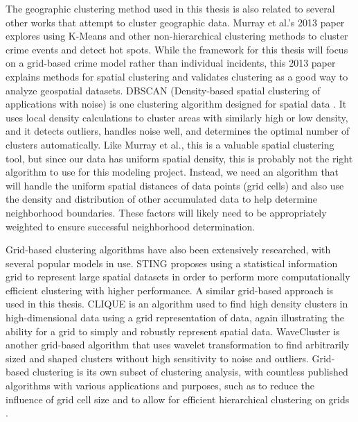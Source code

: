 \documentclass[times new roman,12pt]{article}
\begin{document}
The geographic clustering method used in this thesis is also related to several other works that attempt to cluster geographic data. Murray et al.'s 2013 paper \cite{murray_exploring_2013} explores using K-Means and other non-hierarchical clustering methods to cluster crime events and detect hot spots. While the framework for this thesis will focus on a grid-based crime model rather than individual incidents, this 2013 paper explains methods for spatial clustering and validates clustering as a good way to analyze geospatial datasets. DBSCAN (Density-based spatial clustering of applications with noise)  is one clustering algorithm designed for spatial data \cite{esterdensity}. It uses local density calculations to cluster areas with similarly high or low density, and it detects outliers, handles noise well, and determines the optimal number of clusters automatically. Like Murray et al., this is a valuable spatial clustering tool, but since our data has uniform spatial density, this is probably not the right algorithm to use for this modeling project. Instead, we need an algorithm that will handle the uniform spatial distances of data points (grid cells) and also use the density and distribution of other accumulated data to help determine neighborhood boundaries. These factors will likely need to be appropriately weighted to ensure successful neighborhood determination. 

Grid-based clustering algorithms have also been extensively researched, with several popular models in use. STING \cite{wang_wei_sting_1997} proposes using a statistical information grid to represent large spatial datasets in order to perform more computationally efficient clustering with higher performance. A similar grid-based approach is used in this thesis. CLIQUE \cite{Agrawal:1998:ASC:276304.276314} is an algorithm used to find high density clusters in high-dimensional data using a grid representation of data, again illustrating the ability for a grid to simply and robustly represent spatial data. WaveCluster \cite{Sheikholeslami:2000:WWC:764212.764221} is another grid-based algorithm that uses wavelet transformation to find arbitrarily sized and shaped clusters without high sensitivity to noise and outliers. Grid-based clustering is its own subset of clustering analysis, with countless published algorithms with various applications and purposes, such as to reduce the influence of grid cell size \cite{lin2008deflected} and to allow for efficient hierarchical clustering on grids \cite{schikuta1997bang}.
\end{document}
